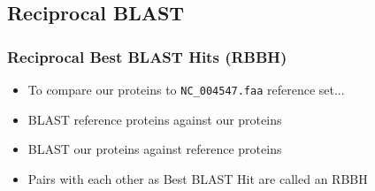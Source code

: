 \documentclass[table]{beamer}
\begin{document}
%
%
%
%
\subsection{Reciprocal BLAST}
\begin{frame}
\frametitle{Reciprocal Best BLAST Hits (RBBH)}
\begin{itemize}
\item To compare our proteins to \texttt{NC\_004547.faa} reference set...
\item BLAST reference proteins against our proteins
\item BLAST our proteins against reference proteins
\item Pairs with each other as Best BLAST Hit are called an RBBH
\end{itemize}
\end{frame}
\end{document}

